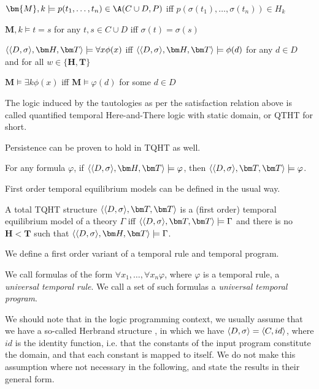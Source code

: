 \begin{description}
  \item $\bm{M},k \models p(t_1, \dots, t_n) \in \A(C \cup D,P)$ iff $p(\sigma(t_1), \dots, \sigma(t_n))\in H_k$
  \item $\bm{M},k \models t = s$ for any $t,s \in C \cup D$ iff $\sigma(t) = \sigma(s)$
  \item $\qthandt \models \forall x \phi(x)$ iff $\qthandt \models \phi(d)$ for any $d \in D$ and for all $w \in \{\bm{H}, \bm{T}\}$ 
  \item $\bm{M} \models \exists k \phi(x)$ iff $\bm{M} \models \varphi(d)$ for some $d \in D$
\end{description}

The logic induced by the tautologies as per the satisfaction relation
above is called quantified temporal Here-and-There logic with static
domain, or QTHT for short.

Persistence can be proven to hold in TQHT as well.

\begin{proposition}
  For any formula $\varphi$, if $\qthandt \models \varphi$, then
  $\qttandt \models \varphi$.
\end{proposition}

First order temporal equilibrium models can be defined in the usual way.

\begin{definition}
  A total TQHT structure $\qttandt$ is a (first order) temporal
  equilibrium model of a theory $\Gamma$ iff $\qttandt \models \Gamma$
  and there is no $\bm{H} < \bm{T}$ such that
  $\qthandt \models \Gamma$.
\end{definition}

We define a first order variant of a temporal rule and temporal program.

\begin{definition} We call
  formulas of the form $\forall x_1, \dots, \forall x_n \varphi$,
  where $\varphi$ is a temporal rule, a \emph{universal temporal rule}. We
  call a set of such formulas a \emph{universal temporal program}.
\end{definition}

We should note that in the logic programming context, we usually
assume that we have a so-called Herbrand structure \cite{peaval06a},
in which we have $\langle D, \sigma \rangle = \langle C, id \rangle$, where $id$ is the
identity function, i.e. that the constants of the input program
constitute the domain, and that each constant is mapped to itself. We
do not make this assumption where not necessary in the following, and
state the results in their general form.

